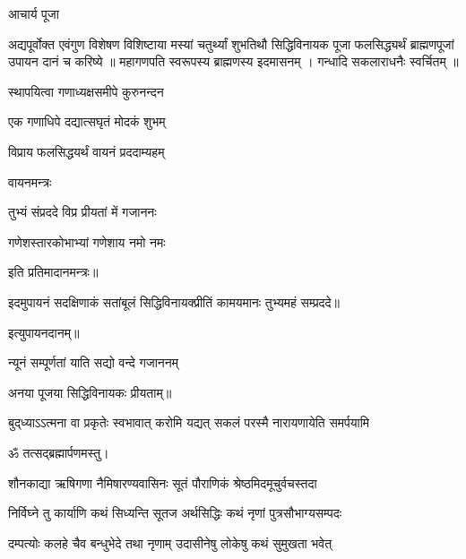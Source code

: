 \begin{center}
\centerline{आचार्य पूजा}

अद्यपूर्वोक्त एवंगुण विशेषण विशिष्टाया मस्यां चतुर्थ्यां शुभतिथौ सिद्धिविनायक पूजा फलसिद्ध्यर्थं ब्राह्मणपूजां उपायन दानं च करिष्ये ॥ महागणपति स्वरूपस्य ब्राह्मणस्य इदमासनम् । गन्धादि सकलाराधनैः स्वर्चितम् ॥

{स्थापयित्वा गणाध्यक्षसमीपे कुरुनन्दन}

{एक गणाधिपे दद्यात्सघृतं मोदकं शुभम्}

{विप्राय फलसिद्धयर्थं वायनं प्रददाम्यहम्} 

\centerline{वायनमन्त्रः}

{तुभ्यं संप्रददे विप्र प्रीयतां में गजाननः}

{गणेशस्तारकोभाभ्यां गणेशाय नमो नमः}

इति प्रतिमादानमन्त्रः॥

इदमुपायनं सदक्षिणाकं सतांबूलं सिद्धिविनायक्प्रीतिं कामयमानः तुभ्यमहं सम्प्रददे॥

इत्युपायनदानम्॥






{न्यूनं सम्पूर्णतां याति सद्यो वन्दे गजाननम्} 

अनया पूजया सिद्धिविनायकः प्रीयताम्॥ 

{बुद्‌ध्याऽऽत्मना वा प्रकृतेः स्वभावात्}
{करोमि यद्यत् सकलं परस्मै}
{नारायणायेति समर्पयामि}

ॐ तत्सद्ब्रह्मार्पणमस्तु।


\twolineshloka
{शौनकाद्या ऋषिगणा नैमिषारण्यवासिनः}
{सूतं पौराणिकं श्रेष्ठमिदमूचुर्वचस्तदा}%


\twolineshloka
{निर्विघ्ने तु कार्याणि कथं सिध्यन्ति सूतज}
{अर्थसिद्धिः कथं नृणां पुत्रसौभाग्यसम्पदः}%

\twolineshloka
{दम्पत्योः कलहे चैव बन्धुभेदे तथा नृणाम्}
{उदासीनेषु लोकेषु कथं सुमुखता भवेत्}%


\end{center}
